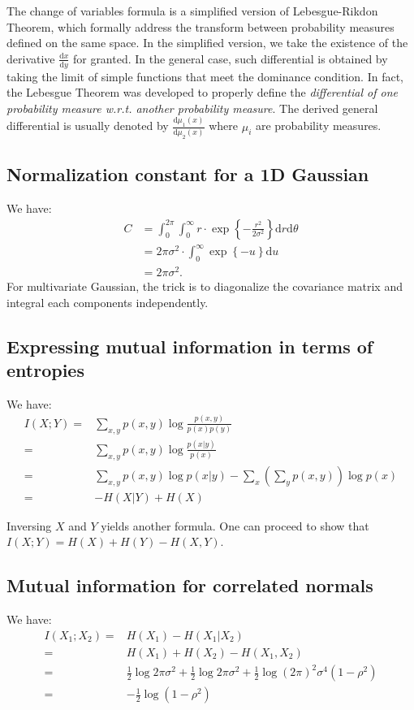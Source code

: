 \documentclass[UTF8]{ctexart}
\begin{document}
The change of variables formula is a simplified version of Lebesgue-Rikdon Theorem, which formally address the transform between probability measures defined on the same space. 
In the simplified version, we take the existence of the derivative $\frac{\text{d}x}{\text{d}y}$ for granted. 
In the general case, such differential is obtained by taking the limit of simple functions that meet the dominance condition. 
In fact, the Lebesgue Theorem was developed to properly define the \emph{differential of one probability measure w.r.t. another probability measure}. 
The derived general differential is usually denoted by $\frac{\text{d}\mu_{1}(x)}{\text{d}\mu_{2}(x)}$ where $\mu_{i}$ are probability measures. 


\subsection{Normalization constant for a 1D Gaussian}
We have:
$$
\begin{aligned}
C&=\int_{0}^{2\pi}\int_{0}^{\infty}r\cdot\exp\left\{-\frac{r^{2}}{2\sigma^{2}} \right\}\text{d}r\text{d}\theta\\
&=2\pi\sigma^{2}\cdot\int_{0}^{\infty}\exp\left\{-u\right\}\text{d}u\\
&=2\pi\sigma^{2}.
\end{aligned}
$$
For multivariate Gaussian, the trick is to diagonalize the covariance matrix and integral each components independently. 


\subsection{Expressing mutual information in terms of entropies}
We have:
\begin{align}
I(X;Y)=&\sum_{x,y}p(x,y) \log \frac{p(x,y)}{p(x)p(y)} \nonumber \\
=&\sum_{x,y}p(x,y)\log \frac{p(x|y)}{p(x)} \nonumber \\
=&\sum_{x,y}p(x,y)\log p(x|y) - \sum_{x}(\sum_{y}p(x,y))\log p(x) \nonumber \\
=&-H(X|Y)+H(X) \nonumber
\end{align}

Inversing $X$ and $Y$ yields another formula.
One can proceed to show that $I(X;Y)=H(X)+H(Y)-H(X,Y)$.

\subsection{Mutual information for correlated normals}
We have:
\begin{align}
I(X_{1};X_{2})=&H(X_{1})-H(X_{1}|X_{2}) \nonumber \\
=&H(X_{1})+H(X_{2})-H(X_{1},X_{2}) \nonumber \\
=&\frac{1}{2}\log 2\pi\sigma^{2}+\frac{1}{2}\log 2\pi\sigma^{2}+\frac{1}{2}\log (2\pi)^{2}\sigma^{4}(1-\rho^{2}) \nonumber \\
=&-\frac{1}{2}\log (1-\rho^{2}) \nonumber
\end{align}
\end{document}
